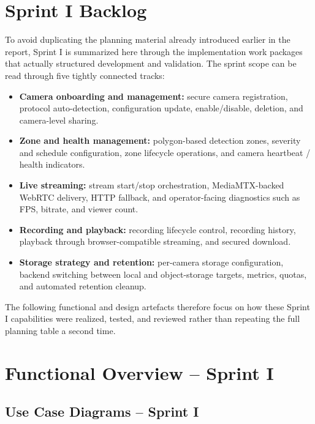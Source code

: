 \documentclass[12pt,a4paper,oneside]{report}
\begin{document}
\section{Sprint I Backlog}
\label{sec:s1_backlog}

\hspace{0.8cm}To avoid duplicating the planning material already introduced earlier in the report, Sprint I is summarized here through the implementation work packages that actually structured development and validation. The sprint scope can be read through five tightly connected tracks:

\begin{itemize}[leftmargin=1.2cm]
  \item \textbf{Camera onboarding and management:} secure camera registration, protocol auto-detection, configuration update, enable/disable, deletion, and camera-level sharing.
  \item \textbf{Zone and health management:} polygon-based detection zones, severity and schedule configuration, zone lifecycle operations, and camera heartbeat / health indicators.
  \item \textbf{Live streaming:} stream start/stop orchestration, MediaMTX-backed WebRTC delivery, HTTP fallback, and operator-facing diagnostics such as FPS, bitrate, and viewer count.
  \item \textbf{Recording and playback:} recording lifecycle control, recording history, playback through browser-compatible streaming, and secured download.
  \item \textbf{Storage strategy and retention:} per-camera storage configuration, backend switching between local and object-storage targets, metrics, quotas, and automated retention cleanup.
\end{itemize}

\hspace{0.8cm}The following functional and design artefacts therefore focus on how these Sprint I capabilities were realized, tested, and reviewed rather than repeating the full planning table a second time.

\section{Functional Overview -- Sprint I}
\label{sec:s1_functional}

\subsection{Use Case Diagrams -- Sprint I}
\label{subsec:s1_use_cases}
\end{document}
